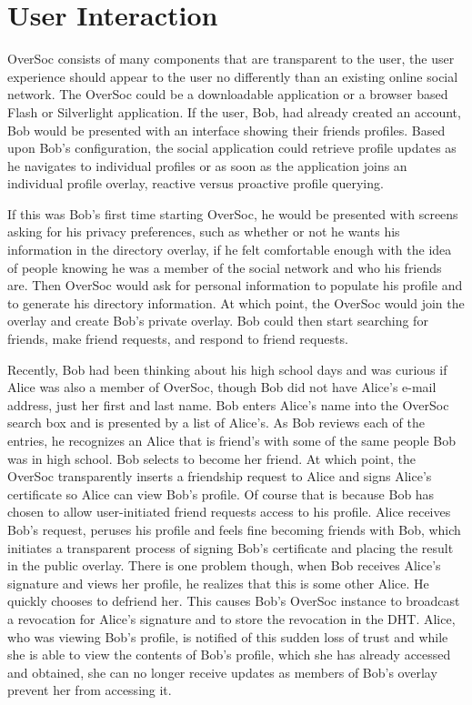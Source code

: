 \documentclass{IEEEtran}
\begin{document}
\section{User Interaction}
\label{user_interaction}

OverSoc consists of many components that are transparent to the user, the user
experience should appear to the user no differently than an existing online
social network.  The OverSoc could be a downloadable application or a browser
based Flash or Silverlight application.  If the user, Bob, had already created
an account, Bob would be presented with an interface showing their friends
profiles.  Based upon Bob's configuration, the social application could
retrieve profile updates as he navigates to individual profiles or as soon as
the application joins an individual profile overlay, reactive versus proactive
profile querying.  

If this was Bob's first time starting OverSoc, he would be presented with
screens asking for his privacy preferences, such as whether or not he wants his
information in the directory overlay, if he felt comfortable enough with the
idea of people knowing he was a member of the social network and who his
friends are.  Then OverSoc would ask for personal information to populate his
profile and to generate his directory information.  At which point, the OverSoc
would join the overlay and create Bob's private overlay.  Bob could then start
searching for friends, make friend requests, and respond to friend requests.

Recently, Bob had been thinking about his high school days and was curious if
Alice was also a member of OverSoc, though Bob did not have Alice's e-mail
address, just her first and last name.  Bob enters Alice's name into the
OverSoc search box and is presented by a list of Alice's.  As Bob reviews each
of the entries, he recognizes an Alice that is friend's with some of the same
people Bob was in high school.  Bob selects to become her friend.  At which
point, the OverSoc transparently inserts a friendship request to Alice and
signs Alice's certificate so Alice can view Bob's profile.  Of course that is
because Bob has chosen to allow user-initiated friend requests access to his
profile.  Alice receives Bob's request, peruses his profile and feels fine
becoming friends with Bob, which initiates a transparent process of signing
Bob's certificate and placing the result in the public overlay.  There is one
problem though, when Bob receives Alice's signature and views her profile, he
realizes that this is some other Alice.  He quickly chooses to defriend her.
This causes Bob's OverSoc instance to broadcast a revocation for Alice's
signature and to store the revocation in the DHT.  Alice, who was viewing Bob's
profile, is notified of this sudden loss of trust and while she is able to view
the contents of Bob's profile, which she has already accessed and obtained, she
can no longer receive updates as members of Bob's overlay prevent her from
accessing it.
\end{document}
